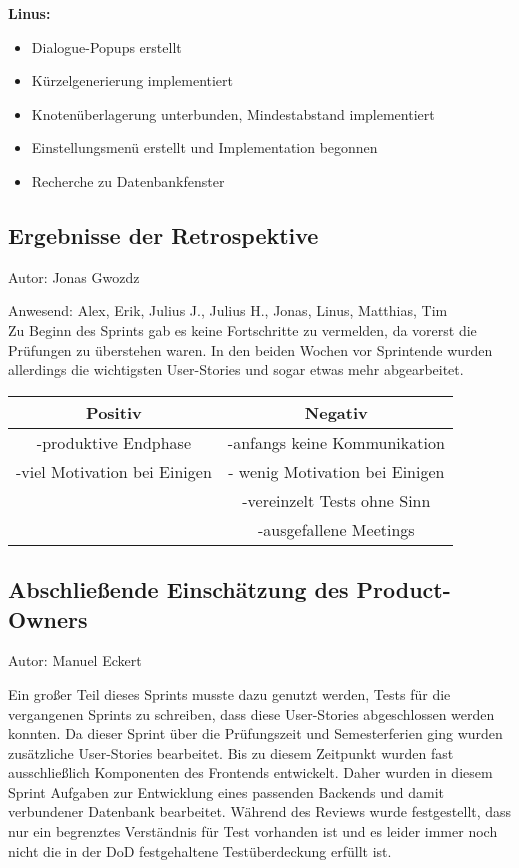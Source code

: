 \textbf{Linus:}
\begin{itemize}
\item Dialogue-Popups erstellt
\item Kürzelgenerierung implementiert
\item Knotenüberlagerung unterbunden, Mindestabstand implementiert
\item Einstellungsmenü erstellt und Implementation begonnen
\item Recherche zu Datenbankfenster
\end{itemize}

\subsection{Ergebnisse der Retrospektive}
{\small Autor: Jonas Gwozdz}

Anwesend: Alex, Erik, Julius J., Julius H., Jonas, Linus, Matthias, Tim\\

Zu Beginn des Sprints gab es keine Fortschritte zu vermelden, da vorerst die Prüfungen zu überstehen waren. In den beiden Wochen vor Sprintende wurden allerdings die wichtigsten User-Stories und sogar etwas mehr abgearbeitet.\\

\begin{center}
\begin{tabular}{ |c|c| }
\hline
 Positiv & Negativ \\
\hline 
 -produktive Endphase & -anfangs keine Kommunikation \\
 -viel Motivation bei Einigen & - wenig Motivation bei Einigen\\
 & -vereinzelt Tests ohne Sinn\\
 & -ausgefallene Meetings\\
\hline     
\end{tabular}
\end{center}
 

\subsection{Abschließende Einschätzung des Product-Owners}
{\small Autor: Manuel Eckert}

Ein großer Teil dieses Sprints musste dazu genutzt werden, Tests für die vergangenen Sprints zu schreiben, dass diese User-Stories abgeschlossen werden konnten.  Da dieser Sprint über die Prüfungszeit und Semesterferien ging wurden zusätzliche User-Stories bearbeitet. 
Bis zu diesem Zeitpunkt wurden fast ausschließlich Komponenten des Frontends entwickelt. Daher wurden in diesem Sprint Aufgaben zur Entwicklung eines passenden Backends und damit verbundener Datenbank bearbeitet. 
Während des Reviews wurde festgestellt, dass nur ein begrenztes Verständnis für Test vorhanden ist und es leider immer noch nicht die in der DoD festgehaltene Testüberdeckung erfüllt ist.  

